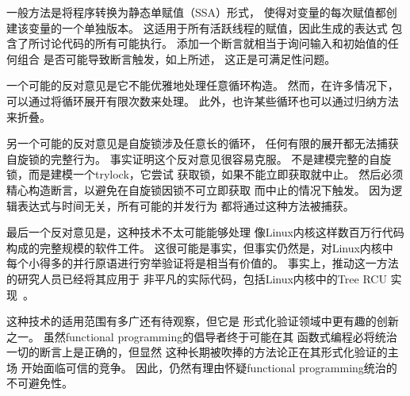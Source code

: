 一般方法是将程序转换为静态单赋值（SSA）形式，
使得对变量的每次赋值都创建该变量的一个单独版本。
这适用于所有活跃线程的赋值，因此生成的表达式
包含了所讨论代码的所有可能执行。
添加一个断言就相当于询问输入和初始值的任何组合
是否可能导致断言触发，如上所述，
这正是可满足性问题。

一个可能的反对意见是它不能优雅地处理任意循环构造。
然而，在许多情况下，可以通过将循环展开有限次数来处理。
此外，也许某些循环也可以通过归纳方法来折叠。

另一个可能的反对意见是自旋锁涉及任意长的循环，
任何有限的展开都无法捕获自旋锁的完整行为。
事实证明这个反对意见很容易克服。
不是建模完整的自旋锁，而是建模一个trylock，它尝试
获取锁，如果不能立即获取就中止。
然后必须精心构造断言，以避免在自旋锁因锁不可立即获取
而中止的情况下触发。
因为逻辑表达式与时间无关，所有可能的并发行为
都将通过这种方法被捕获。

最后一个反对意见是，这种技术不太可能能够处理
像Linux内核这样数百万行代码构成的完整规模的软件工件。
这很可能是事实，但事实仍然是，对Linux内核中
每个小得多的并行原语进行穷举验证将是相当有价值的。
事实上，推动这一方法的研究人员已经将其应用于
非平凡的实际代码，包括Linux内核中的Tree RCU
实现~\cite{LihaoLiang2016VerifyTreeRCU,MichalisKokologiannakis2017NidhuggRCU}。

这种技术的适用范围有多广还有待观察，但它是
形式化验证领域中更有趣的创新之一。
虽然functional programming的倡导者终于可能在其
函数式编程必将统治一切的断言上是正确的，但显然
这种长期被吹捧的方法论正在其形式化验证的主场
开始面临可信的竞争。
因此，仍然有理由怀疑functional programming统治的不可避免性。
